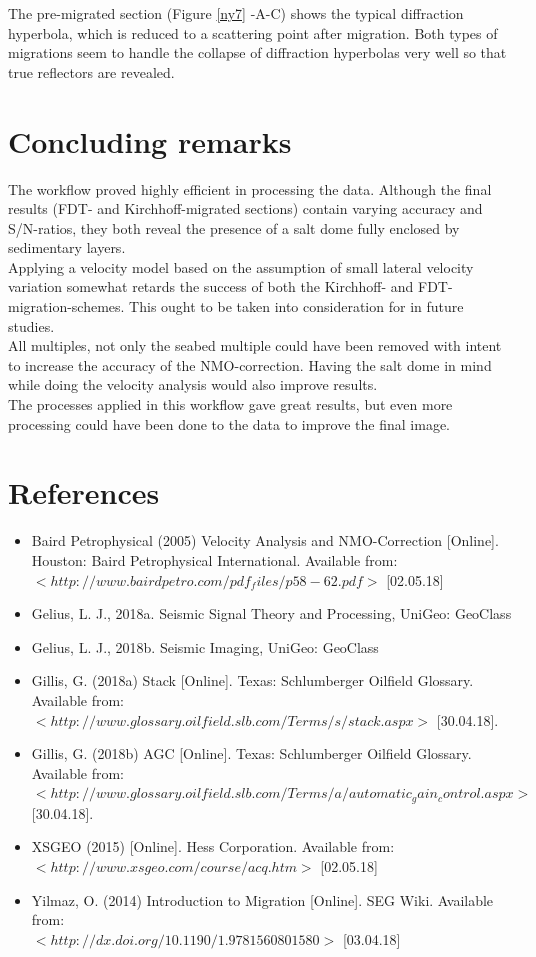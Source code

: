\documentclass[10pt,a4paper]{article}
\begin{document}
\noindent The pre-migrated section (Figure \ref{ny7} -A-C) shows the typical diffraction hyperbola, which is reduced to a scattering point after migration. Both types of migrations seem to handle the collapse of diffraction hyperbolas very well so that true reflectors are revealed. 

\newpage

\section{Concluding remarks}
The workflow proved highly efficient in processing the data. Although the final results (FDT- and Kirchhoff-migrated sections) contain varying accuracy and S/N-ratios, they both reveal the presence of a salt dome fully enclosed by sedimentary layers. 
\\
Applying a velocity model based on the assumption of small lateral velocity variation somewhat retards the success of both the Kirchhoff- and FDT-migration-schemes. This ought to be taken into consideration for in future studies.
\\
All multiples, not only the seabed multiple could have been removed with intent to increase the accuracy of the NMO-correction. Having the salt dome in mind while doing the velocity analysis would also improve results.
\\
The processes applied in this workflow gave great results, but even more processing could have been done to the data to improve the final image.

\newpage

\section{References}

\begin{itemize}
    \item Baird Petrophysical (2005) Velocity Analysis and NMO-Correction [Online]. Houston: Baird Petrophysical International. Available from: $<http://www.bairdpetro.com/pdf_files/p58-62.pdf>$ [02.05.18]
    \item Gelius, L. J., 2018a. Seismic Signal Theory and Processing, UniGeo: GeoClass 
    \item Gelius, L. J., 2018b. Seismic Imaging, UniGeo: GeoClass
    \item Gillis, G. (2018a) Stack [Online]. Texas: Schlumberger Oilfield Glossary. Available from:\\ $<http://www.glossary.oilfield.slb.com/Terms/s/stack.aspx>$ [30.04.18].
    \item Gillis, G. (2018b) AGC [Online]. Texas: Schlumberger Oilfield Glossary. Available from:\\ $<http://www.glossary.oilfield.slb.com/Terms/a/automatic_gain_control.aspx>$ [30.04.18].
    \item XSGEO (2015) [Online]. Hess Corporation. Available from: $<http://www.xsgeo.com/course/acq.htm>$ [02.05.18]
    \item Yilmaz, O. (2014) Introduction to Migration [Online]. SEG Wiki. Available from:\\ $<http://dx.doi.org/10.1190/1.9781560801580>$ [03.04.18]
\end{itemize}
\end{document}
